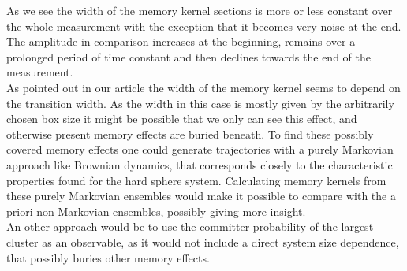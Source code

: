 As we see the width of the memory kernel sections is more or less constant over the whole measurement with the exception that it becomes very noise at the end.\\
The amplitude in comparison increases at the beginning, remains over a prolonged period of time constant and then declines towards the end of the measurement.\\
As pointed out in our article\cite{Meyer2021} the width of the memory kernel seems to depend on the transition width. As the width in this case is mostly given by the arbitrarily chosen box size it might be possible that we only can see this effect, and otherwise present memory effects are buried beneath. To find these possibly covered memory effects one could generate trajectories with a purely Markovian approach like Brownian dynamics, that corresponds closely to the characteristic properties found for the hard sphere system. Calculating memory kernels from these purely Markovian ensembles would make it possible to compare with the a priori non Markovian ensembles, possibly giving more insight.\\
An other approach would be to use the committer probability of the largest cluster as an observable, as it would not include a direct system size dependence, that possibly buries other memory effects.
